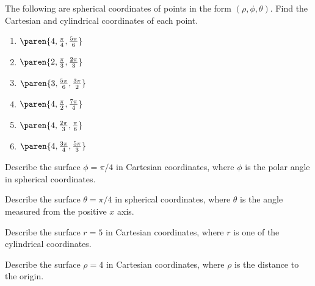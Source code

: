 \begin{ex}
The following are spherical coordinates of points in the form $(
\rho,\phi,\theta)$. Find the Cartesian and cylindrical
coordinates of each point.

\begin{enumerate}
\item $\paren{4,\frac{\pi }{4},\frac{5\pi }{6}} $

\item $\paren{2,\frac{\pi }{3},\frac{2\pi }{3}} $

\item $\paren{3,\frac{5\pi }{6},\frac{3\pi }{2}} $

\item $\paren{4,\frac{\pi }{2},\frac{7\pi }{4}} $

\item $\paren{4,\frac{2\pi }{3},\frac{\pi }{6}} $

\item $\paren{4,\frac{3\pi }{4},\frac{5\pi }{3}} $
\end{enumerate}
\end{ex}

\begin{ex} Describe the surface $\phi =\pi
/4$ in Cartesian coordinates, where $\phi $ is the polar angle in spherical coordinates.
\end{ex}

\begin{ex} Describe the surface $\theta =\pi /4$ in spherical coordinates, where $\theta $ is
the angle measured from the positive $x$ axis.
\end{ex}

\begin{ex} Describe the surface $r=5$ in Cartesian coordinates, where
$r$ is one of the cylindrical coordinates.
\end{ex}

\begin{ex} Describe the surface $\rho =4$ in Cartesian coordinates,
where $\rho $ is the distance to the origin.
\end{ex}

